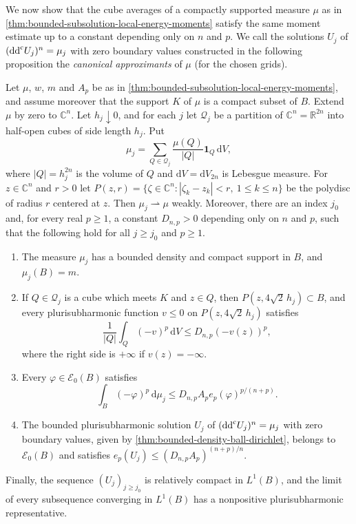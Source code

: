 We now show that the cube averages of a compactly supported measure $\mu$ as in \cref{thm:bounded-subsolution-local-energy-moments} satisfy the same moment estimate up to a constant depending only on $n$ and $p$. We call the solutions $U_j$ of $(\mathrm{dd}^{\mathrm{c}} U_j)^n=\mu_j$ with zero boundary values constructed in the following proposition the \emph{canonical approximants} of $\mu$ (for the chosen grids).

\begin{proposition}\label{prop:canonical-grid-energy-control}
Let $\mu$, $w$, $m$ and $A_p$ be as in \cref{thm:bounded-subsolution-local-energy-moments}, and assume moreover that the support $K$ of $\mu$ is a compact subset of $B$. Extend $\mu$ by zero to $\mathbb C^n$. Let $h_j\downarrow0$, and for each $j$ let $\mathcal Q_j$ be a partition of $\mathbb C^n=\mathbb R^{2n}$ into half-open cubes of side length $h_j$. Put
\[
 \mu_j=\sum_{Q\in\mathcal Q_j}\frac{\mu(Q)}{|Q|}\mathbf1_Q\,\mathrm dV,
\]
where $|Q|=h_j^{2n}$ is the volume of $Q$ and $\mathrm dV=\mathrm dV_{2n}$ is Lebesgue measure. For $z\in\mathbb C^n$ and $r>0$ let $P(z,r)=\{\zeta\in\mathbb C^n:|\zeta_k-z_k|<r,\ 1\le k\le n\}$ be the polydisc of radius $r$ centered at $z$. Then $\mu_j\rightharpoonup\mu$ weakly. Moreover, there are an index $j_0$ and, for every real $p\geq1$, a constant $D_{n,p}>0$ depending only on $n$ and $p$, such that the following hold for all $j\geq j_0$ and $p\geq1$.
\begin{enumerate}
\item The measure $\mu_j$ has a bounded density and compact support in $B$, and $\mu_j(B)=m$.
\item If $Q\in\mathcal Q_j$ is a cube which meets $K$ and $z\in Q$, then $P(z,4\sqrt2\,h_j)\subset B$, and every plurisubharmonic function $v\le0$ on $P(z,4\sqrt2\,h_j)$ satisfies
\begin{equation}\label{eq:canonical-grid-polydisc-average}
 \frac1{|Q|}\int_Q(-v)^p\,\mathrm dV
                         \leq D_{n,p}(-v(z))^p,
\end{equation}
where the right side is $+\infty$ if $v(z)=-\infty$.
\item Every $\varphi\in\mathcal E_0(B)$ satisfies
\begin{equation}\label{eq:canonical-grid-energy-moment}
 \int_B(-\varphi)^p\,\mathrm d\mu_j
        \leq D_{n,p}A_p e_p(\varphi)^{p/(n+p)}.
\end{equation}
\item The bounded plurisubharmonic solution $U_j$ of $(\mathrm{dd}^{\mathrm{c}} U_j)^n=\mu_j$ with zero boundary values, given by \cref{thm:bounded-density-ball-dirichlet}, belongs to $\mathcal E_0(B)$ and satisfies $e_p(U_j)\leq(D_{n,p}A_p)^{(n+p)/n}$.
\end{enumerate}
Finally, the sequence $(U_j)_{j\geq j_0}$ is relatively compact in $L^1(B)$, and the limit of every subsequence converging in $L^1(B)$ has a nonpositive plurisubharmonic representative.
\end{proposition}
